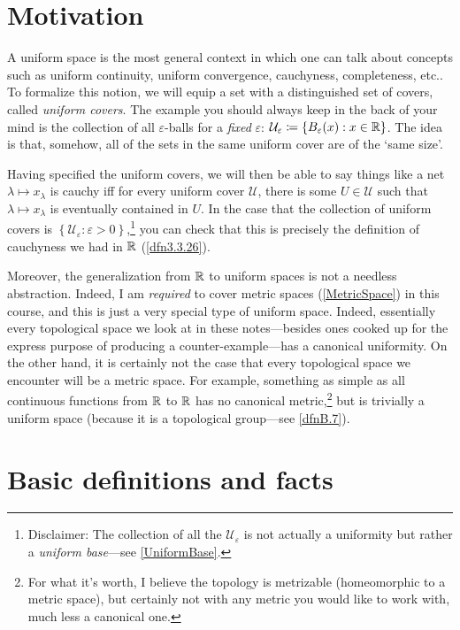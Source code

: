 \section{Motivation}

A uniform space is the most general context in which one can talk about concepts such as uniform continuity, uniform convergence, cauchyness, completeness, etc..  To formalize this notion, we will equip a set with a distinguished set of covers, called \emph{uniform covers}.  The example you should always keep in the back of your mind is the collection of all $\varepsilon$-balls for a \emph{fixed} $\varepsilon$:  $\mathcal{U}_\varepsilon \coloneqq \left\{ B_\varepsilon (x):x\in \mathbb{R} \right\}$.  The idea is that, somehow, all of the sets in the same uniform cover are of the `same size'.

Having specified the uniform covers, we will then be able to say things like a net $\lambda \mapsto x_\lambda$ is cauchy iff for every uniform cover $\mathcal{U}$, there is some $U\in \mathcal{U}$ such that $\lambda \mapsto x_\lambda$ is eventually contained in $U$.  In the case that the collection of uniform covers is $\left\{ \mathcal{U}_\varepsilon :\varepsilon >0\right\}$,\footnote{Disclaimer:  The collection of all the $\mathcal{U}_{\varepsilon}$ is not actually a uniformity but rather a \emph{uniform base}---see \cref{UniformBase}.} you can check that this is precisely the definition of cauchyness we had in $\mathbb{R}$ (\cref{dfn3.3.26}).

Moreover, the generalization from $\mathbb{R}$ to uniform spaces is not a needless abstraction.  Indeed, I am \emph{required} to cover metric spaces (\cref{MetricSpace}) in this course, and this is just a very special type of uniform space.  Indeed, essentially every topological space we look at in these notes---besides ones cooked up for the express purpose of producing a counter-example---has a canonical uniformity.  On the other hand, it is certainly not the case that every topological space we encounter will be a metric space.  For example, something as simple as all continuous functions from $\mathbb{R}$ to $\mathbb{R}$ has no canonical metric,\footnote{For what it's worth, I believe the topology is metrizable (homeomorphic to a metric space), but certainly not with any metric you would like to work with, much less a canonical one.} but is trivially a uniform space (because it is a topological group---see \cref{dfnB.7}).

\section{Basic definitions and facts}

